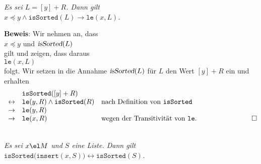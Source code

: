 \begin{Korollar}
{\em
  Es sei $L = [y] + R$. Dann gilt \\[0.1cm]
  \hspace*{1.3cm} 
  $x \preceq y \wedge \mathtt{isSorted}(L) \rightarrow \mathtt{le}(x,L)$.
}
\end{Korollar}

\noindent
\textbf{Beweis}: Wir nehmen an, dass \\[0.1cm]
\hspace*{1.3cm} $x \preceq y$ \quad und \quad $\textsl{isSorted}(L)$ \\[0.1cm]
gilt und zeigen, dass daraus \\[0.1cm]
\hspace*{1.3cm} $\mathtt{le}(x,L)$ \\[0.1cm]
folgt.  Wir setzen in die Annahme $\textsl{isSorted}(L)$ f\"ur $L$ den Wert $[y] + R$ ein und erhalten 
$$
\begin{array}[b]{lll}
                & \mathtt{isSorted}([y] + R) \\
\leftrightarrow & \mathtt{le}(y, R) \wedge \mathtt{isSorted}(R) & \mbox{nach Definition von \texttt{isSorted}} \\
\rightarrow     & \mathtt{le}(y, R)  \\
\rightarrow     & \mathtt{le}(x, R) & \mbox{wegen der Transitivit\"at von \texttt{le}}. 
\end{array}\hspace*{2.6cm} \Box
$$

\begin{Lemma} \hspace*{\fill}\\
{\em
  Es sei $x\el M$ und $S$ eine Liste. Dann gilt \\[0.1cm]
  \hspace*{1.3cm} $ \mathtt{isSorted}\bigl(\mathtt{insert}(x,S) \bigr) \leftrightarrow \mathtt{isSorted}(S)$. 
}  
\end{Lemma}
  
